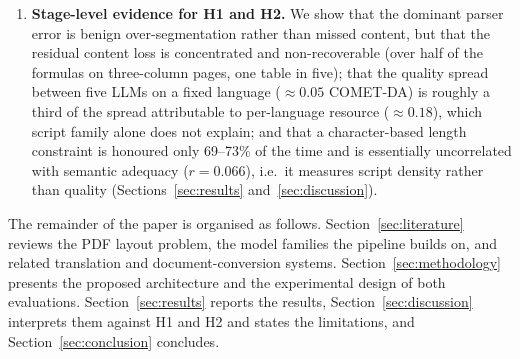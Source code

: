 \begin{enumerate}[leftmargin=1.4em]
  \item \textbf{Stage-level evidence for H1 and H2.} We show that the dominant
  parser error is benign over-segmentation rather than missed content, but that
  the residual content loss is concentrated and non-recoverable (over half of
  the formulas on three-column pages, one table in five); that the quality
  spread between five LLMs on a fixed language ($\approx 0.05$ COMET-DA) is
  roughly a third of the spread attributable to per-language resource
  ($\approx 0.18$), which script family alone does not explain; and that a
  character-based length constraint is honoured only 69--73\% of the time and is
  essentially uncorrelated with semantic adequacy ($r = 0.066$), i.e.\ it
  measures script density rather than quality (Sections~\ref{sec:results}
  and~\ref{sec:discussion}).
\end{enumerate}

The remainder of the paper is organised as follows.
Section~\ref{sec:literature} reviews the PDF layout problem, the model
families the pipeline builds on, and related translation and document-conversion
systems.
Section~\ref{sec:methodology} presents the proposed architecture and the
experimental design of both evaluations. Section~\ref{sec:results} reports the
results, Section~\ref{sec:discussion} interprets them against H1 and H2 and
states the limitations, and Section~\ref{sec:conclusion} concludes.

